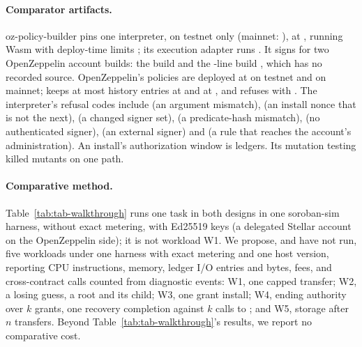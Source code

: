 \paragraph{Comparator artifacts.} oz-policy-builder pins one interpreter, on
testnet only (mainnet: ), at
, running Wasm 
with deploy-time limits ; its execution adapter runs
. It signs for two OpenZeppelin account builds: the
 build  and the
-line build , which has no
recorded source. OpenZeppelin's policies are deployed at
 on testnet and  on mainnet;
 keeps at most  history
entries at  and  at
, and refuses with . The
interpreter's refusal codes include  (an argument
mismatch),  (an install nonce that is not the next),
 (a changed signer set),
 (a predicate-hash mismatch),
 (no authenticated signer),
 (an external signer) and
 (a rule that reaches the account's
administration). An install's authorization window is
 ledgers. Its mutation testing killed
 mutants on one path.


\paragraph{Comparative method.} Table~\ref{tab:tab-walkthrough} runs one task in
both designs in one soroban-sim harness, without exact metering, with Ed25519 keys
(a delegated Stellar account on the OpenZeppelin side); it is not workload W1.
We propose, and have not run, five workloads under one harness with exact
metering and one host version, reporting CPU instructions, memory, ledger I/O
entries and bytes, fees, and cross-contract calls counted from diagnostic events:
W1, one capped transfer; W2, a losing guess, a root and its child; W3, one grant
install; W4, ending authority over $k$ grants, one recovery completion against $k$
calls to ; and W5, storage after $n$ transfers. Beyond
Table~\ref{tab:tab-walkthrough}'s results, we report no comparative cost.
